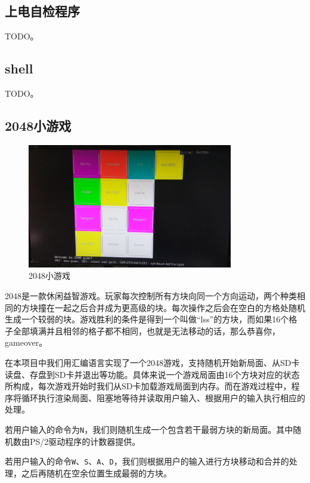 \documentclass[11pt,utf8]{report}
\begin{document}
\subsection{上电自检程序}
	\par TODO。

\subsection{shell}
	\par TODO。

\subsection{2048小游戏}
	\begin{center}
	\begin{figure}[H]
			\centering
			\includegraphics[width=0.8\textwidth]{2048.jpg}
			\caption{2048小游戏}
		\end{figure}
	\end{center}

2048是一款休闲益智游戏。玩家每次控制所有方块向同一个方向运动，两个种类相同的方块撞在一起之后合并成为更高级的块。每次操作之后会在空白的方格处随机生成一个较弱的块。游戏胜利的条件是得到一个叫做“lss”的方块，而如果16个格子全部填满并且相邻的格子都不相同，也就是无法移动的话，那么恭喜你，gameover。

在本项目中我们用汇编语言实现了一个2048游戏，支持随机开始新局面、从SD卡读盘、存盘到SD卡并退出等功能。具体来说一个游戏局面由16个方块对应的状态所构成，每次游戏开始时我们从SD卡加载游戏局面到内存。而在游戏过程中，程序将循环执行渲染局面、阻塞地等待并读取用户输入、根据用户的输入执行相应的处理。

若用户输入的命令为\texttt{N}，我们则随机生成一个包含若干最弱方块的新局面。其中随机数由PS/2驱动程序的计数器提供。

若用户输入的命令\texttt{W}、\texttt{S}、\texttt{A}、\texttt{D}，我们则根据用户的输入进行方块移动和合并的处理，之后再随机在空余位置生成最弱的方块。
\end{document}
